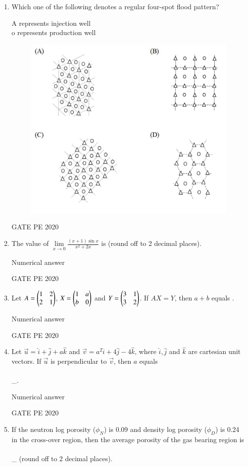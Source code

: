 \documentclass[journal,12pt,onecolumn]{IEEEtran}
\theoremstyle{remark}
\begin{document}
\begin{enumerate}
\item Which one of the following denotes a regular four-spot flood pattern?

\noindent A represents injection well \\
\noindent o represents production well \\
\begin{figure}[h]
    \centering
    \includegraphics[width=0.5\linewidth]{figs/3.jpeg}
    \caption{}
    \label{fig:placeholder}
\end{figure}


  \hfill{GATE PE 2020}
   
\item The value of $\lim\limits_{x \to 0} \frac{(x+1)\sin x}{x^2 + 2x}$ is  (round off to 2 decimal places).

   Numerical answer

  \hfill{GATE PE 2020}

\item Let $A = \begin{pmatrix}1 & 2 \\ 2 & 1 \end{pmatrix}$, $X = \begin{pmatrix} 1 & a \\ b & 0 \end{pmatrix}$ and $Y = \begin{pmatrix} 3 & 1 \\ 3 & 2 \end{pmatrix}$. If $AX = Y$, then $a + b$ equals .

   Numerical answer

  \hfill{GATE PE 2020}
   
\item Let $\vec{u} = \hat{i} + \hat{j} + a\hat{k}$ and $\vec{v} = a^2\hat{i} + 4\hat{j} - 4\hat{k}$, where $\hat{i}, \hat{j}$ and $\hat{k}$ are cartesian unit vectors. If $\vec{u}$ is perpendicular to $\vec{v}$, then $a$ equals \\\\\_.

   Numerical answer

  \hfill{GATE PE 2020}
   
\item If the neutron log porosity ($\phi_N$) is 0.09 and density log porosity ($\phi_D$) is 0.24 in the cross-over region, then the average porosity of the gas bearing region is \\\\\_ (round off to 2 decimal places).


\end{enumerate}
\end{document}
